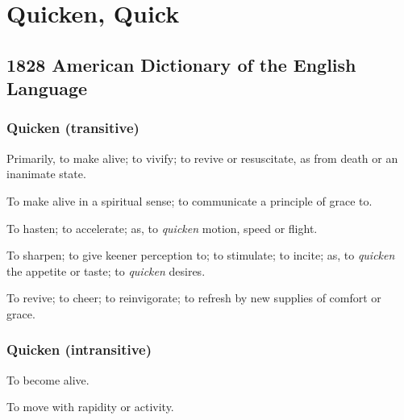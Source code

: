 \section{Quicken, Quick}
	\label{QUICKEN}
	

\subsection{1828 American Dictionary of the English Language} %
	\label{QUICKEN-1828}
	
	\subsubsection{Quicken (transitive)}

		\begin{compactitem}
			\item[1] Primarily, to make alive; to vivify; to revive or resuscitate, as from death or an inanimate state.
			\item[2] To make alive in a spiritual sense; to communicate a principle of grace to.
			\item[3] To hasten; to accelerate; as, to \textit{quicken} motion, speed or flight.
			\item[4] To sharpen; to give keener perception to; to stimulate; to incite; as, to \textit{quicken} the appetite or taste; to \textit{quicken} desires.
			\item[5] To revive; to cheer; to reinvigorate; to refresh by new supplies of comfort or grace.
		\end{compactitem}
		
	\subsubsection{Quicken (intransitive)}
	
		\begin{compactitem}
			\item[1] To become alive.
			\item[2] To move with rapidity or activity.
		\end{compactitem}
		

